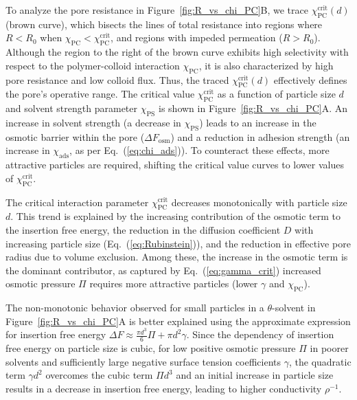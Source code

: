 \documentclass[12pt, a4paper]{article}
\begin{document}
To analyze the pore resistance in Figure~\ref{fig:R_vs_chi_PC}B, we trace $\chi_{\text{PC}}^{\text{crit}}(d)$ (brown curve), which bisects the lines of total resistance into regions where $R < R_{0}$ when $\chi_{\text{PC}} < \chi_{\text{PC}}^{\text{crit}}$, and regions with impeded permeation ($R > R_{0}$).
Although the region to the right of the brown curve exhibits high selectivity with respect to the polymer-colloid interaction $\chi_{\text{PC}}$, it is also characterized by high pore resistance and low colloid flux.
Thus, the traced $\chi_{\text{PC}}^{\text{crit}}(d)$ effectively defines the pore's operative range.
The critical value $\chi_{\text{PC}}^{\text{crit}}$ as a function of particle size $d$ and solvent strength parameter $\chi_{\text{PS}}$ is shown in Figure~\ref{fig:R_vs_chi_PC}A.
An increase in solvent strength (a decrease in $\chi_{\text{PS}}$) leads to an increase in the osmotic barrier within the pore ($\Delta F_{\text{osm}}$) and a reduction in adhesion strength (an increase in $\chi_{\text{ads}}$, as per Eq.~(\ref{eq:chi_ads})).
To counteract these effects, more attractive particles are required, shifting the critical value curves to lower values of $\chi_{\text{PC}}^{\text{crit}}$.

The critical interaction parameter $\chi_{\text{PC}}^{\text{crit}}$ decreases monotonically with particle size $d$. 
This trend is explained by the increasing contribution of the osmotic term to the insertion free energy, the reduction in the diffusion coefficient $D$ with increasing particle size (Eq.~(\ref{eq:Rubinstein})), and the reduction in effective pore radius due to volume exclusion.
Among these, the increase in the osmotic term is the dominant contributor, as captured by Eq.~(\ref{eq:gamma_crit}) increased osmotic pressure $\Pi$ requires more attractive particles (lower $\gamma$ and $\chi_{\text{PC}}$).

The non-monotonic behavior observed for small particles in a $\theta$-solvent in Figure~\ref{fig:R_vs_chi_PC}A is better explained using the approximate expression for insertion free energy $\Delta F \approx \frac{\pi d^3}{6} \Pi + \pi d^2 \gamma$.
Since the dependency of insertion free energy on particle size is cubic, for low positive osmotic pressure $\Pi$ in poorer solvents and sufficiently large negative surface tension coefficients $\gamma$, the quadratic term $\gamma d^2$ overcomes the cubic term $\Pi d^3$ and an initial increase in particle size results in a decrease in insertion free energy, leading to higher conductivity $\rho^{-1}$.
\end{document}
